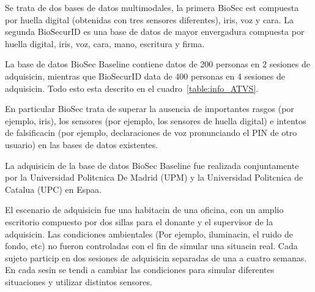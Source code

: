  \label{sec:ATVS_database}

Se trata de dos bases de datos multimodales, la primera BioSec est compuesta por huella digital (obtenidas con tres sensores diferentes), iris, voz y cara. La segunda BioSecurID es una base de datos de mayor envergadura compuesta por huella digital, iris, voz, cara, mano, escritura y firma.

La base de datos BioSec Baseline contiene datos de 200 personas en 2 sesiones de adquisicin, mientras que BioSecurID data de 400 personas en 4 sesiones de adquisicin. Todo esto esta descrito en el cuadro~\ref{table:info_ATVS}.

En particular BioSec trata de superar la ausencia de importantes rasgos (por ejemplo, iris), los sensores (por ejemplo, los sensores de huella digital) e intentos de falsificacin (por ejemplo, declaraciones de voz pronunciando el PIN de otro usuario) en las bases de datos existentes.

La adquisicin de la base de datos BioSec Baseline fue realizada conjuntamente por la Universidad Politcnica De Madrid (UPM) y la Universidad Politcnica de Catalua (UPC) en Espaa.

El escenario de adquisicin fue una habitacin de una oficina, con un amplio escritorio compuesto por dos sillas para el donante y el supervisor de la adquisicin. Las condiciones ambientales (Por ejemplo, iluminacin, el ruido de fondo, etc) no fueron controladas con el fin de simular una situacin real. Cada sujeto particip en dos sesiones de adquisicin separadas de una a cuatro semanas. En cada sesin se tendi a cambiar las condiciones para simular diferentes situaciones y utilizar distintos sensores.
%
%
%
%

